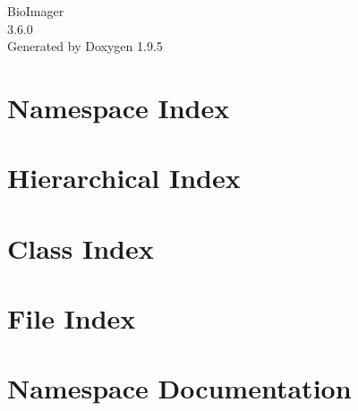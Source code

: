 \documentclass[twoside]{book}
\newcommand{\+}{\discretionary{\mbox{\scriptsize$\hookleftarrow$}}{}{}}
\newcommand{\clearemptydoublepage}{%
    \newpage{\pagestyle{empty}\cleardoublepage}%
  }
\begin{document}
  \raggedbottom
    \hypersetup{pageanchor=false,
                bookmarksnumbered=true,
                pdfencoding=unicode
               }
  \begin{titlepage}
  \vspace*{7cm}
  \begin{center}%
  {\Large Bio\+Imager}\\
  [1ex]\large 3.\+6.\+0 \\
  \vspace*{1cm}
  {\large Generated by Doxygen 1.9.5}\\
  \end{center}
  \end{titlepage}
  \clearemptydoublepage
  \tableofcontents
  \clearemptydoublepage
  \hypersetup{pageanchor=true}
\chapter{Namespace Index}

\chapter{Hierarchical Index}

\chapter{Class Index}

\chapter{File Index}

\chapter{Namespace Documentation}


\end{document}
